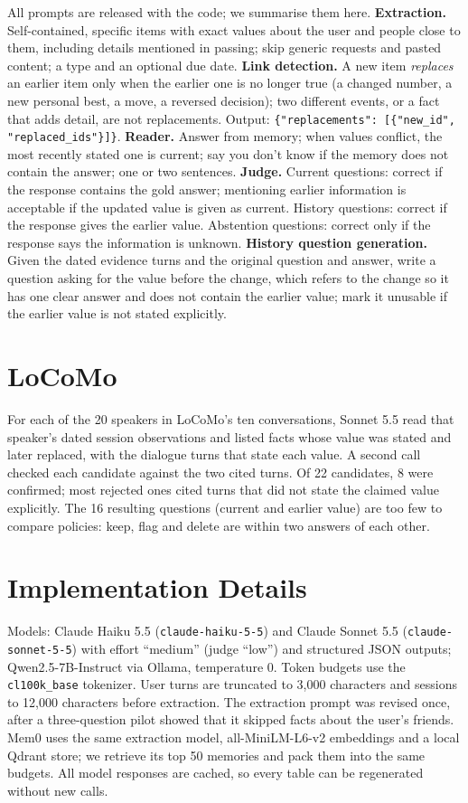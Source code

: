 \documentclass[11pt]{article}
\begin{document}
All prompts are released with the code; we summarise them here.
\textbf{Extraction.} Self-contained, specific items with exact values about the user and people close
to them, including details mentioned in passing; skip generic requests and pasted content; a type and
an optional due date. \textbf{Link detection.} A new item \emph{replaces} an earlier item only when
the earlier one is no longer true (a changed number, a new personal best, a move, a reversed
decision); two different events, or a fact that adds detail, are not replacements. Output:
\texttt{\{"replacements": [\{"new\_id", "replaced\_ids"\}]\}}. \textbf{Reader.} Answer from memory;
when values conflict, the most recently stated one is current; say you don't know if the memory
does not contain the answer; one or two sentences. \textbf{Judge.} Current questions: correct if the
response contains the gold answer; mentioning earlier information is acceptable if the updated value
is given as current. History questions: correct if the response gives the earlier value. Abstention
questions: correct only if the response says the information is unknown. \textbf{History question
generation.} Given the dated evidence turns and the original question and answer, write a question
asking for the value before the change, which refers to the change so it has one clear answer and
does not contain the earlier value; mark it unusable if the earlier value is not stated explicitly.

\section{LoCoMo}
\label{app:locomo}

For each of the 20 speakers in LoCoMo's ten conversations, Sonnet 5.5 read that speaker's dated
session observations and listed facts whose value was stated and later replaced, with the dialogue
turns that state each value. A second call checked each candidate against the two cited turns. Of 22
candidates, 8 were confirmed; most rejected ones cited turns that did not state the claimed value
explicitly. The 16 resulting questions (current and earlier value) are too few to compare policies:
keep, flag and delete are within two answers of each other.

\section{Implementation Details}

Models: Claude Haiku 5.5 (\texttt{claude-haiku-5-5}) and Claude Sonnet 5.5
(\texttt{claude-sonnet-5-5}) with effort ``medium'' (judge ``low'') and structured JSON outputs;
Qwen2.5-7B-Instruct via Ollama, temperature 0. Token budgets use the \texttt{cl100k\_base}
tokenizer. User turns are truncated to 3,000 characters and sessions to 12,000 characters before
extraction. The extraction prompt was revised once, after a three-question pilot showed that it
skipped facts about the user's friends. Mem0 uses the same extraction model, all-MiniLM-L6-v2
embeddings and a local Qdrant store; we retrieve its top 50 memories and pack them into the same
budgets. All model responses are cached, so every table can be regenerated without new calls.
\end{document}
